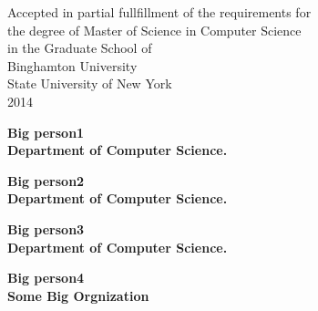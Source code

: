 \newpage
\vspace{15.0in}
\begin{center}
\begin{singlespace}
\vspace{15.0in}
  Accepted in partial fullfillment of the requirements for \\
    the degree of Master of Science in Computer Science \\
              in the Graduate School of \\
	        Binghamton University \\
             State University of New York \\
	                 2014 
\end{singlespace}
\end{center}

        \begin{flushleft}
        \vspace{0.5in}
	  {\bf Big person1}{\hspace{3mm}}\underline{\hspace{3.5in}}\\
	  {\bf Department of Computer Science.}{\hspace{2.7in}}\\
        \vspace{0.5in}

	  {\bf Big person2}{\hspace{3mm}}\underline{\hspace{3.5in}}\\
	  {\bf Department of Computer Science.}{\hspace{2.7in}}\\
        \vspace{0.5in}

	  {\bf Big person3}{\hspace{3mm}}\underline{\hspace{3.5in}}\\
	  {\bf Department of Computer Science.}{\hspace{2.7in}}\\
        \vspace{0.5in}

	  {\bf Big person4}{\hspace{3mm}}\underline{\hspace{3.0in}}\\
	  {\bf Some Big Orgnization}{\hspace{2.7in}}\\
	 \end{flushleft}
